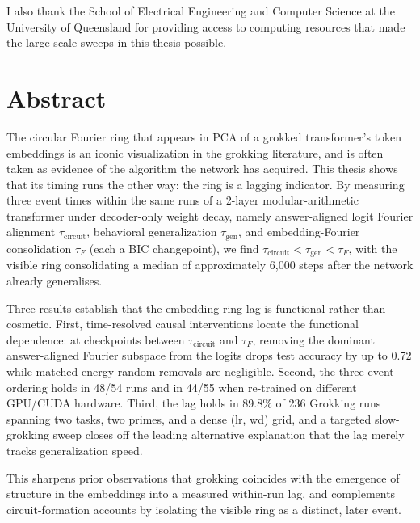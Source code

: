 \documentclass[12pt,openany,a4paper]{book}
\newcommand{\taug}{\tau_{\mathrm{gen}}}
\newcommand{\tauf}{\tau_{F}}
\newcommand{\taucirc}{\tau_{\mathrm{circuit}}}
\begin{document}
I also thank the School of Electrical Engineering and Computer Science at the University of Queensland for providing access to computing resources that made the large-scale sweeps in this thesis possible.


\chapter{Abstract}

The circular Fourier ring that appears in PCA of a grokked transformer's token embeddings is an iconic visualization in the grokking literature, and is often taken as evidence of the algorithm the network has acquired. This thesis shows that its timing runs the other way: the ring is a lagging indicator. By measuring three event times within the same runs of a 2-layer modular-arithmetic transformer under decoder-only weight decay, namely answer-aligned logit Fourier alignment $\taucirc$, behavioral generalization $\taug$, and embedding-Fourier consolidation $\tauf$ (each a BIC changepoint), we find $\taucirc < \taug < \tauf$, with the visible ring consolidating a median of approximately 6,000 steps after the network already generalises.

Three results establish that the embedding-ring lag is functional rather than cosmetic. First, time-resolved causal interventions locate the functional dependence: at checkpoints between $\taucirc$ and $\tauf$, removing the dominant answer-aligned Fourier subspace from the logits drops test accuracy by up to 0.72 while matched-energy random removals are negligible. Second, the three-event ordering holds in 48/54 runs and in 44/55 when re-trained on different GPU/CUDA hardware. Third, the lag holds in 89.8\% of 236 Grokking runs spanning two tasks, two primes, and a dense (lr, wd) grid, and a targeted slow-grokking sweep closes off the leading alternative explanation that the lag merely tracks generalization speed.

This sharpens prior observations that grokking coincides with the emergence of structure in the embeddings into a measured within-run lag, and complements circuit-formation accounts by isolating the visible ring as a distinct, later event.

\tableofcontents

\listoffigures
{}

\listoftables
{}

\cleardoublepage
\end{document}
